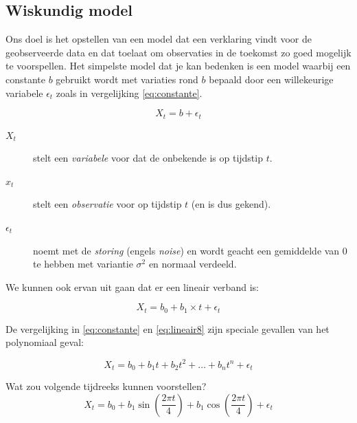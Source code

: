 \subsection{Wiskundig model}
Ons doel is het opstellen van een model dat een verklaring vindt voor de geobserveerde data en dat toelaat om observaties in de toekomst zo goed mogelijk te voorspellen. Het simpelste model dat je kan bedenken is een model waarbij een constante $b$ gebruikt wordt met variaties rond $b$ bepaald door een willekeurige variabele $\epsilon_{t}$ zoals in vergelijking \ref{eq:constante}. 

\begin{equation}
	X_{t} = b + \epsilon_{t}
\label{eq:constante}
\end{equation}

\begin{description}
	\item [$X_{t}$] stelt een \textit{variabele} voor dat de onbekende is op tijdstip $t$.
	\item [$x_{t}$] stelt een \textit{observatie} voor op tijdstip $t$ (en is dus gekend). 
	\item [$\epsilon_{t}$] noemt met de \textit{storing} (engels \textsl{noise}) en wordt geacht een gemiddelde van $0$ te hebben met variantie $\sigma^{2}$ en normaal verdeeld. 
\end{description}




We kunnen ook ervan uit gaan dat er een lineair verband is:

\begin{equation}
	X_{t} = b_{0} + b_{1} \times t + \epsilon_{t}
\label{eq:lineair8}
\end{equation}

De vergelijking in \ref{eq:constante} en \ref{eq:lineair8} zijn speciale gevallen van het polynomiaal geval:

\begin{equation}
	X_{t} = b_{0} + b_{1} t + b_{2} t^{2} + \dots + b_{n} t^{n} + \epsilon_{t} 
\label{eq:polynomiaal}
\end{equation}

\begin{exercise}
	Wat zou volgende tijdreeks kunnen voorstellen?
	\begin{equation}
		X_{t} = b_{0} + b_{1} \sin(\frac{2\pi t}{4}) + b_{1} \cos(\frac{2\pi t}{4}) + \epsilon_{t}
	\label{eq:seasonal}
\end{equation}
\end{exercise}

